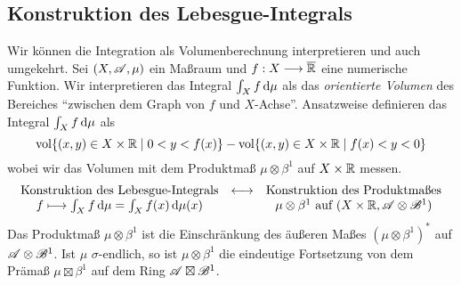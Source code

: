 \subsection{Konstruktion des Lebesgue-Integrals}

Wir können die Integration als Volumenberechnung interpretieren und auch umgekehrt. Sei $(X,\AA,\mu)$ ein Maßraum und $f:X \longrightarrow \ol\R$ eine numerische Funktion. Wir interpretieren das Integral $\int_X f \D \mu$ als das \emph{orientierte Volumen} des Bereiches ``zwischen dem Graph von $f$ und $X$-Achse''. Ansatzweise definieren das Integral $\int_X f \D \mu$ als
$$
\vol \{ (x,y) \in X \times \R \mid 0<y<f(x)\}-\vol \{(x,y)\in X \times \R \mid f(x)<y<0\}
$$
wobei wir das Volumen mit dem Produktmaß $\mu \otimes \beta^1$ auf $X\times \R$ messen.\\
\begin{equation*}
\begin{array}{ccc}
\te{Konstruktion des Lebesgue-Integrals} & \longleftrightarrow & \te{Konstruktion des Produktmaßes} \\
f \longmapsto \int_X f \D \mu = \int_X f(x)\D \mu(x) &&\mu \otimes \beta^1 \te{ auf } (X \times \R, \AA \otimes \BB^1) 
\end{array}
\end{equation*}
Das Produktmaß $\mu \otimes \beta^1$ ist die Einschränkung des äußeren Maßes $(\mu \otimes \beta^1)^*$ auf $\AA \otimes \BB^1$. Ist $\mu$ $\sigma$-endlich, so 
ist $\mu \otimes \beta^1$ die eindeutige Fortsetzung von dem Prämaß $\mu \boxtimes \beta^1$ auf dem Ring $\AA \boxtimes \BB^1$.

